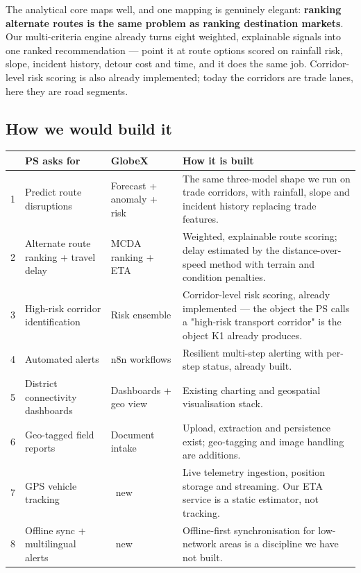 \documentclass[11pt]{article}
\newcommand{\bld}{{\color{gxamber}\ding{53}}}       %
\begin{document}
The analytical core maps well, and one mapping is genuinely elegant: \textbf{ranking alternate routes is
the same problem as ranking destination markets}. Our multi-criteria engine already turns eight weighted,
explainable signals into one ranked recommendation --- point it at route options scored on rainfall risk,
slope, incident history, detour cost and time, and it does the same job. Corridor-level risk scoring is
also already implemented; today the corridors are trade lanes, here they are road segments.

\subsection*{How we would build it}
\renewcommand{\arraystretch}{1.35}
\noindent\begin{longtable}{@{}p{0.5cm}p{4.5cm}p{2.0cm}p{8.6cm}@{}}
\toprule
& \textbf{PS asks for} & \textbf{GlobeX} & \textbf{How it is built} \\
\midrule
\endhead
1 & Predict route disruptions & Forecast + anomaly + risk & The same three-model shape we run on trade corridors, with rainfall, slope and incident history replacing trade features. \\
2 & Alternate route ranking + travel delay & MCDA ranking + ETA & Weighted, explainable route scoring; delay estimated by the distance-over-speed method with terrain and condition penalties. \\
3 & High-risk corridor identification & Risk ensemble & Corridor-level risk scoring, already implemented --- the object the PS calls a "high-risk transport corridor" is the object K1 already produces. \\
4 & Automated alerts & n8n workflows & Resilient multi-step alerting with per-step status, already built. \\
5 & District connectivity dashboards & Dashboards + geo view & Existing charting and geospatial visualisation stack. \\
6 & Geo-tagged field reports & Document intake & Upload, extraction and persistence exist; geo-tagging and image handling are additions. \\
7 & GPS vehicle tracking & \bld\ new & Live telemetry ingestion, position storage and streaming. Our ETA service is a static estimator, not tracking. \\
8 & Offline sync + multilingual alerts & \bld\ new & Offline-first synchronisation for low-network areas is a discipline we have not built. \\
\bottomrule
\end{longtable}
\end{document}
